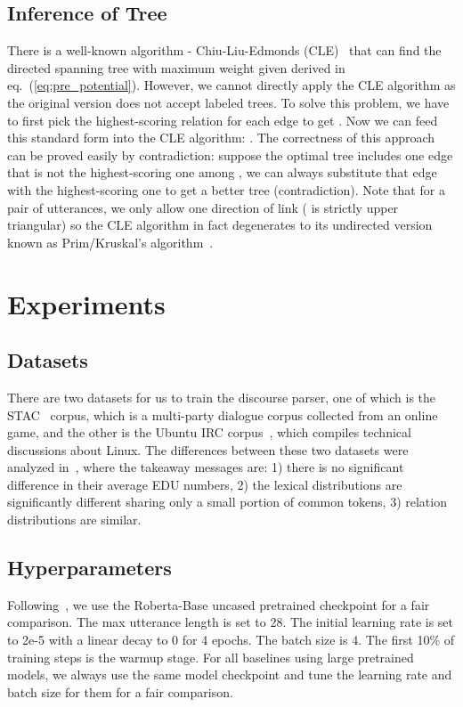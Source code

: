 \documentclass[11pt]{article}
\begin{document}
\subsection{Inference of Tree}
\label{sec:inference}
There is a well-known algorithm - Chiu-Liu-Edmonds (CLE)~\cite{edmonds1967optimum,chu1965shortest} that can find the directed spanning tree  with maximum weight given  derived in eq.~(\ref{eq:pre_potential}). However, we cannot directly apply the CLE algorithm as the original version does not accept labeled trees. To solve this problem, we have to first pick the highest-scoring relation for each edge  to get . Now we can feed this standard form into the CLE algorithm: . The correctness of this approach can be proved easily by contradiction: suppose the optimal tree includes one edge that is not the highest-scoring one among , we can always substitute that edge with the highest-scoring one to get a better tree (contradiction). Note that for a pair of utterances, we only allow one direction of link ( is strictly upper triangular) so the CLE algorithm in fact degenerates to its undirected version known as Prim/Kruskal's algorithm~\cite{prim1957shortest,kruskal1956shortest}.

\section{Experiments}
\label{sec:exp}
\subsection{Datasets}
There are two datasets for us to train the discourse parser, one of which is the STAC~\cite{asher2016discourse} corpus, which is a multi-party dialogue corpus collected from an online game, and the other is the Ubuntu IRC corpus~\cite{li2020molweni}, which compiles technical discussions about Linux. The differences between these two datasets were analyzed in~\citet{liu-chen-2021-improving}, where the takeaway messages are: 1) there is no significant difference in their average EDU numbers, 2) the lexical distributions are significantly different sharing only a small portion of common
tokens, 3) relation distributions are similar.


\subsection{Hyperparameters}
Following~\citet{liu-chen-2021-improving}, we use the Roberta-Base uncased pretrained checkpoint for a fair comparison. The max utterance length is set to 28. The initial learning rate is set to 2e-5 with a linear decay to 0 for 4 epochs. The batch size is 4. The first 10\% of training steps is the warmup stage. For all baselines using large pretrained models, we always use the same model checkpoint and tune the learning rate and batch size for them for a fair comparison.
\end{document}
